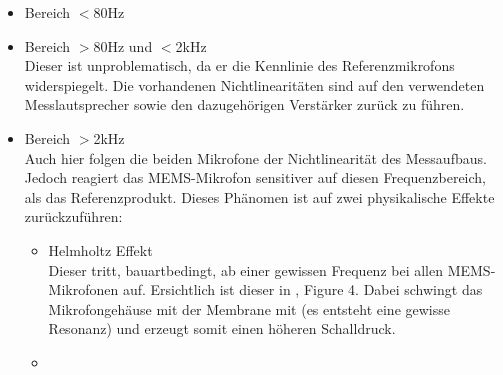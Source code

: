 \documentclass[12pt]{article}
\begin{document}
		\begin{itemize}
			\item \color{green} Bereich $<$80Hz \color{black} \\
			\item Bereich $>$80Hz und $<$2kHz \\
			Dieser ist unproblematisch, da er die Kennlinie des Referenzmikrofons widerspiegelt. Die vorhandenen Nichtlinearitäten sind auf den verwendeten Messlautsprecher sowie den dazugehörigen Verstärker zurück zu führen.
			\item \color{orange} Bereich $>$2kHz \color{black} \\
			Auch hier folgen die beiden Mikrofone der Nichtlinearität des Messaufbaus. Jedoch reagiert das \color{blue}MEMS\color{black}-Mikrofon sensitiver auf diesen Frequenzbereich, als das Referenzprodukt. Dieses Phänomen ist auf zwei physikalische Effekte zurückzuführen:
			\begin{itemize}
				\item Helmholtz Effekt \\
				Dieser tritt, bauartbedingt, ab einer gewissen Frequenz bei allen MEMS-Mikrofonen auf. Ersichtlich ist dieser in \cite{noauthor_httpsinvensensetdkcomwp-contentuploads202007ds-000157-ics-41351-v14pdf_nodate}, Figure 4. Dabei schwingt das Mikrofongehäuse mit der Membrane mit (es entsteht eine gewisse Resonanz) und erzeugt somit einen höheren Schalldruck.
				\item 
			\end{itemize}
			
		\end{itemize}
		
\end{document}
